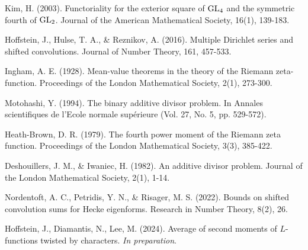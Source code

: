 \documentclass[12pt,reqno,oneside]{amsart}
\begin{document}
\begin{thebibliography}{99}
  Kim, H. (2003). Functoriality for the exterior square of $\mathrm{GL}_{4}$ and the symmetric fourth of $\mathrm{GL}_{2}$. Journal of the American Mathematical Society, 16(1), 139-183.

  Hoffstein, J., Hulse, T. A., \& Reznikov, A. (2016). Multiple Dirichlet series and shifted convolutions. Journal of Number Theory, 161, 457-533.

  Ingham, A. E. (1928). Mean-value theorems in the theory of the Riemann zeta-function. Proceedings of the London Mathematical Society, 2(1), 273-300.

  Motohashi, Y. (1994). The binary additive divisor problem. In Annales scientifiques de l'Ecole normale supérieure (Vol. 27, No. 5, pp. 529-572).

  Heath-Brown, D. R. (1979). The fourth power moment of the Riemann zeta function. Proceedings of the London Mathematical Society, 3(3), 385-422.

  Deshouillers, J. M., \& Iwaniec, H. (1982). An additive divisor problem. Journal of the London Mathematical Society, 2(1), 1-14.

  Nordentoft, A. C., Petridis, Y. N., \& Risager, M. S. (2022). Bounds on shifted convolution sums for Hecke eigenforms. Research in Number Theory, 8(2), 26.

  Hoffstein, J., Diamantis, N., Lee, M. (2024). Average of second moments of $L$-functions twisted by characters. \textit{In preparation}.

\end{thebibliography}
\end{document}
